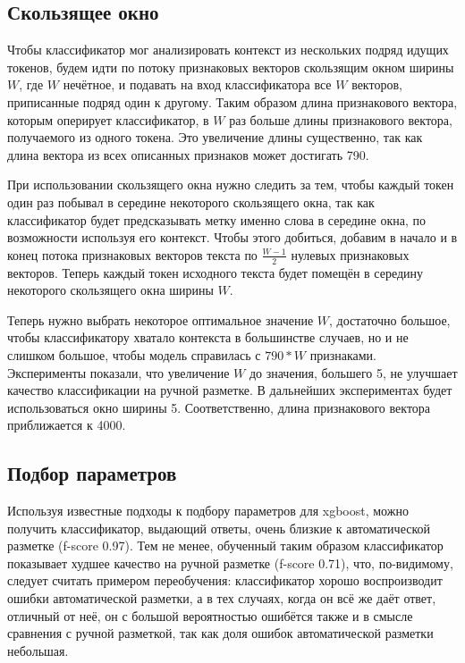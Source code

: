 \documentclass[14pt,russian]{extreport}
\begin{document}
\subsection{Скользящее окно}

Чтобы классификатор мог анализировать контекст из нескольких подряд идущих
токенов, будем идти по потоку признаковых векторов скользящим окном ширины $W$,
где $W$ нечётное, и подавать на вход классификатора все $W$ векторов,
приписанные подряд один к другому. Таким образом длина признакового вектора,
которым оперирует классификатор, в $W$ раз больше длины признакового вектора,
получаемого из одного токена. Это увеличение длины существенно, так как длина вектора из всех описанных признаков может достигать 790.

При использовании скользящего окна нужно следить за тем, чтобы каждый токен
один раз побывал в середине некоторого скользящего окна, так как классификатор
будет предсказывать метку именно слова в середине окна, по возможности
используя его контекст. Чтобы этого добиться, добавим в начало и в конец потока
признаковых векторов текста по $\frac{W-1}{2}$ нулевых признаковых векторов.
Теперь каждый токен исходного текста будет помещён в середину некоторого
скользящего окна ширины $W$.

Теперь нужно выбрать некоторое оптимальное значение $W$, достаточно большое,
чтобы классификатору хватало контекста в большинстве случаев, но и не слишком
большое, чтобы модель справилась с $790 * W$ признаками. Эксперименты показали,
что увеличение $W$ до значения, большего 5, не улучшает качество классификации
на ручной разметке. В дальнейших экспериментах будет использоваться окно ширины
5. Соответственно, длина признакового вектора приближается к 4000.

\subsection{Подбор параметров}

Используя известные подходы\cite{tunexgb} к подбору параметров для xgboost,
можно получить классификатор, выдающий ответы, очень близкие к автоматической
разметке (f-score 0.97).
Тем не менее, обученный таким образом классификатор показывает худшее качество
на ручной разметке (f-score 0.71), что, по-видимому, следует считать примером
переобучения: классификатор хорошо воспроизводит ошибки автоматической
разметки, а в тех случаях, когда он всё же даёт ответ, отличный от неё, он с
большой вероятностью ошибётся также и в смысле сравнения с ручной разметкой,
так как доля ошибок автоматической разметки небольшая.
\end{document}
